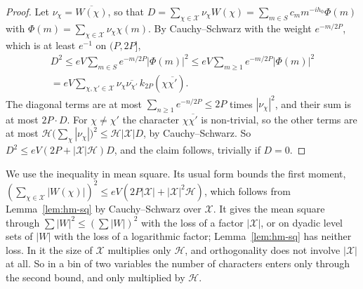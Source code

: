 \documentclass[11pt]{article}
\theoremstyle{definition}
\begin{document}
\begin{proof}
Let $\nu_\chi = \overline{W(\chi)}$, so that $D = \sum_{\chi \in \mathcal X} \nu_\chi W(\chi) = \sum_{m \in S} c_m
m^{-ih_0} \Phi(m)$ with $\Phi(m) = \sum_{\chi \in \mathcal X} \nu_\chi \chi(m)$. By Cauchy--Schwarz with the weight
$e^{-m/2P}$, which is at least $e^{-1}$ on $(P, 2P]$,
\begin{multline*}
  D^2 \le e V \sum_{m \in S} e^{-m/2P} |\Phi(m)|^2 \le e V \sum_{m \ge 1} e^{-m/2P} |\Phi(m)|^2 \\
  = e V \sum_{\chi, \chi' \in \mathcal X} \nu_\chi \overline{\nu_{\chi'}}\, k_{2P}(\chi \overline{\chi'}).
\end{multline*}
The diagonal terms are at most $\sum_{n \ge 1} e^{-n/2P} \le 2P$ times $|\nu_\chi|^2$, and their sum is at most $2P
\cdot D$. For $\chi \ne \chi'$ the character $\chi\overline{\chi'}$ is non-trivial, so the other terms are at most
$\mathcal H \bigl(\sum_\chi |\nu_\chi|\bigr)^2 \le \mathcal H |\mathcal X| D$, by Cauchy--Schwarz. So $D^2 \le e V(2P +
|\mathcal X|\mathcal H) D$, and the claim follows, trivially if $D = 0$.
\end{proof}

We use the inequality in mean square. Its usual form bounds the first moment,
$(\sum_{\chi \in \mathcal X} |W(\chi)|)^2 \le e V (2P |\mathcal X| + |\mathcal X|^2 \mathcal H)$, which follows from
Lemma~\ref{lem:hm-sq} by Cauchy--Schwarz over $\mathcal X$. It gives the mean square through $\sum |W|^2 \le
(\sum |W|)^2$ with the loss of a factor $|\mathcal X|$, or on dyadic level sets of $|W|$ with the loss of a
logarithmic factor; Lemma~\ref{lem:hm-sq} has neither loss. In it the size of $\mathcal X$ multiplies only
$\mathcal H$, and orthogonality does not involve $|\mathcal X|$ at all. So in a bin of two variables the
number of characters enters only through the second bound, and only multiplied by $\mathcal H$.
\end{document}
